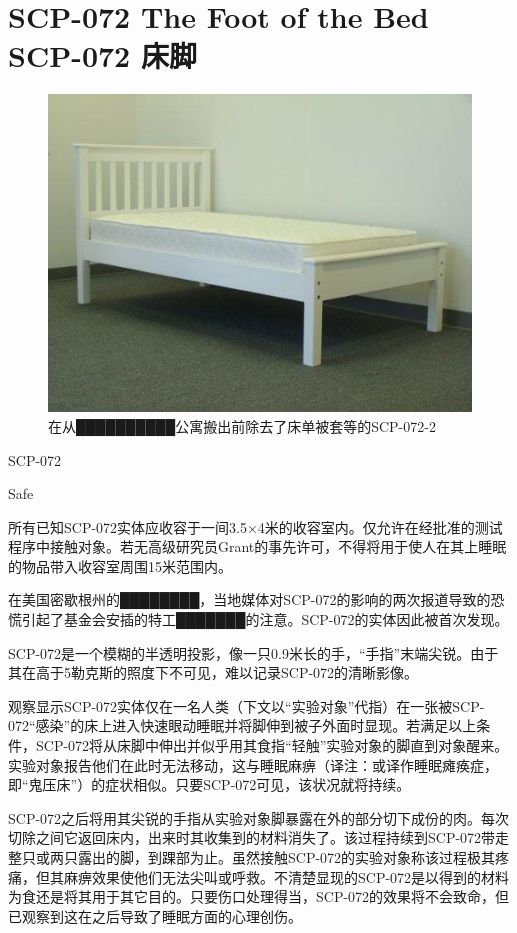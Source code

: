 \chapter[SCP-072 床脚]{
    SCP-072 The Foot of the Bed\\
    SCP-072 床脚
}

\label{chap:SCP-072}

\begin{figure}[H]
    \centering
    \includegraphics[width=0.5\linewidth]{images/SCP.072.jpg}
    \caption*{在从██████████公寓搬出前除去了床单被套等的SCP-072-2}
\end{figure}

SCP-072

Safe

所有已知SCP-072实体应收容于一间3.5×4米的收容室内。仅允许在经批准的测试程序中接触对象。若无高级研究员Grant的事先许可，不得将用于使人在其上睡眠的物品带入收容室周围15米范围内。

在美国密歇根州的████████，当地媒体对SCP-072的影响的两次报道导致的恐慌引起了基金会安插的特工███████的注意。SCP-072的实体因此被首次发现。

SCP-072是一个模糊的半透明投影，像一只0.9米长的手，“手指”末端尖锐。由于其在高于5勒克斯的照度下不可见，难以记录SCP-072的清晰影像。

观察显示SCP-072实体仅在一名人类（下文以“实验对象”代指）在一张被SCP-072“感染”的床上进入快速眼动睡眠并将脚伸到被子外面时显现。若满足以上条件，SCP-072将从床脚中伸出并似乎用其食指“轻触”实验对象的脚直到对象醒来。实验对象报告他们在此时无法移动，这与睡眠麻痹（译注：或译作睡眠瘫痪症，即“鬼压床”）的症状相似。只要SCP-072可见，该状况就将持续。

SCP-072之后将用其尖锐的手指从实验对象脚暴露在外的部分切下成份的肉。每次切除之间它返回床内，出来时其收集到的材料消失了。该过程持续到SCP-072带走整只或两只露出的脚，到踝部为止。虽然接触SCP-072的实验对象称该过程极其疼痛，但其麻痹效果使他们无法尖叫或呼救。不清楚显现的SCP-072是以得到的材料为食还是将其用于其它目的。只要伤口处理得当，SCP-072的效果将不会致命，但已观察到这在之后导致了睡眠方面的心理创伤。

